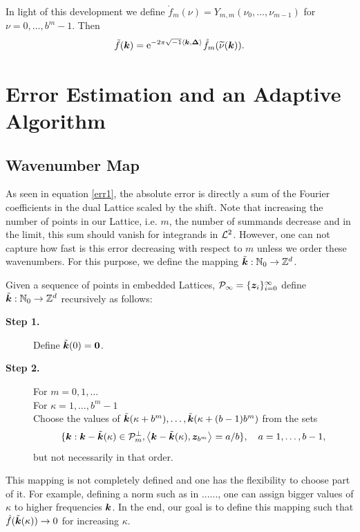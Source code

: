 \documentclass[graybox,footinfo]{svmult}
\newcommand{\Z}{\mathbb{Z}} %
\newcommand{\N}{\mathbb{N}} %
\newcommand{\bszero}{\boldsymbol{0}} %
\newcommand{\bsz}{\boldsymbol{z}}    %
\newcommand{\bsDelta}{\boldsymbol{\Delta}}    %
\begin{document}
In light of this development we define $\mathring{f}_m(\nu)=Y_{m,m}(\nu_0, \ldots, \nu_{m-1})$ for $\nu=0, \ldots, b^{m}-1$. Then
\[
\tf(\bsk) = \me^{-2 \pi \sqrt{-1} \ip{\bsk}{\bsDelta}} \mathring{f}_m(\tnu(\bsk)).
\]

\section{Error Estimation and an Adaptive Algorithm}

\subsection{Wavenumber Map}

As seen in equation \eqref{err1}, the absolute error is directly a sum of the Fourier coefficients in the dual Lattice scaled by the shift. Note that increasing the number of points in our Lattice, i.e. $m$, the number of summands decrease and in the limit, this sum should vanish for integrands in $\mathcal{L}^2$. However, one can not capture how fast is this error decreasing with respect to $m$ unless we order these wavenumbers. For this purpose, we define the mapping $\tvk: \N_0 \to \Z^d$.

\begin{definition} \label{wavenummapdef} Given a sequence of points in embedded Lattices, $\cp_{\infty} = \{\bsz_i\}_{i=0}^{\infty}$ define $\tvk: \N_0 \to \Z^d$ recursively as follows:
\begin{description}
\item[\textbf{Step 1.}] Define $\tvk(0)=\bszero$.

\item[\textbf{Step 2.}] For $m=0, 1, \ldots$ \\
\hspace*{1.3cm} For $\kappa = 1, \ldots, b^{m} -1 $ \\
\hspace*{1.6cm} Choose the values of $\tilde{\boldsymbol{k}}(\kappa+b^{m}), \ldots, \tilde{\boldsymbol{k}}(\kappa+(b-1)b^{m})$ from the sets
\[
\{\bsk : \bsk - \tvk(\kappa) \in \cp_{m}^{\perp}, \ip{\bsk - \tvk(\kappa)}{\bsz_{b^m}}=a/b \}, \quad a=1, \ldots, b-1,
\]
\hspace*{1.6cm} but not necessarily in that order.
\end{description}
\end{definition}

This mapping is not completely defined and one has the flexibility to choose part of it. For example, defining a norm such as in ......, one can assign bigger values of $\kappa$ to higher frequencies $\boldsymbol{k}$. In the end, our goal is to define this mapping such that $\hat{f}(\tilde{\boldsymbol{k}}(\kappa))\rightarrow 0$ for increasing $\kappa$.
\end{document}

